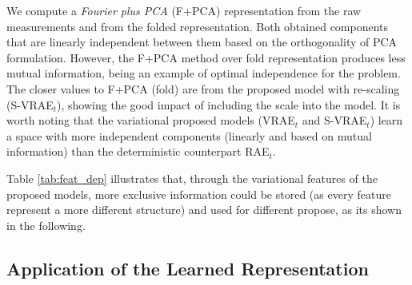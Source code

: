We compute a \textit{Fourier plus PCA} (F+PCA) representation from the raw measurements and from the folded representation. Both obtained components that are linearly independent between them based on the orthogonality of PCA formulation. However, the F+PCA method over fold representation produces less mutual information, being an example of optimal independence for the problem.
The closer values to F+PCA (fold) are from the proposed model with re-scaling (S-VRAE$_t$), showing the good impact of including the scale into the model. It is worth noting that the variational proposed models (VRAE$_t$ and S-VRAE$_t$) learn a space with more independent components (linearly and based on mutual information) than the deterministic counterpart RAE$_t$. 

Table \ref{tab:feat_dep} illustrates that, through the variational features of the proposed models, more exclusive information could be stored (as every feature represent a more different structure) and used for different propose, as its shown in the following.

\subsection{Application of the Learned Representation} 

